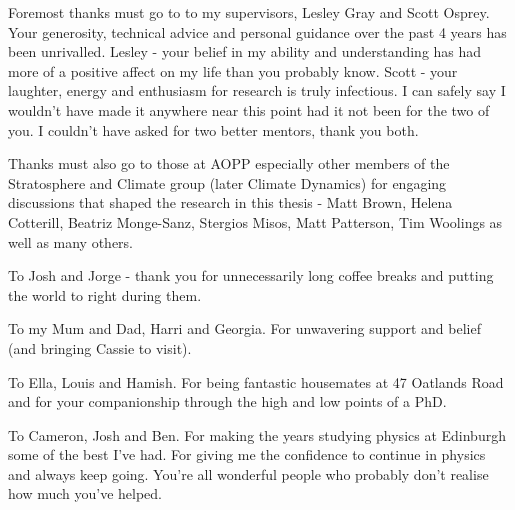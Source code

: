 \begin{acknowledgements}

Foremost thanks must go to to my supervisors, Lesley Gray and Scott Osprey. Your generosity, technical advice and personal guidance over the past 4 years has been unrivalled. Lesley - your belief in my ability and understanding has had more of a positive affect on my life than you probably know. Scott - your laughter, energy and enthusiasm for research is truly infectious. I can safely say I wouldn't have made it anywhere near this point had it not been for the two of you. I couldn't have asked for two better mentors, thank you both.

Thanks must also go to those at AOPP especially other members of the Stratosphere and Climate group (later Climate Dynamics) for engaging discussions that shaped the research in this thesis - Matt Brown, Helena Cotterill, Beatriz Monge-Sanz, Stergios Misos, Matt Patterson, Tim Woolings as well as many others. 

To Josh and Jorge - thank you for unnecessarily long coffee breaks and putting the world to right during them.

To my Mum and Dad, Harri and Georgia. For unwavering support and belief (and bringing Cassie to visit).

To Ella, Louis and Hamish. For being fantastic housemates at 47 Oatlands Road and for your companionship through the high and low points of a PhD.

To Cameron, Josh and Ben. For making the years studying physics at Edinburgh some of the best I've had. For giving me the confidence to continue in physics and always keep going. You're all wonderful people who probably don't realise how much you've helped.

\end{acknowledgements}




